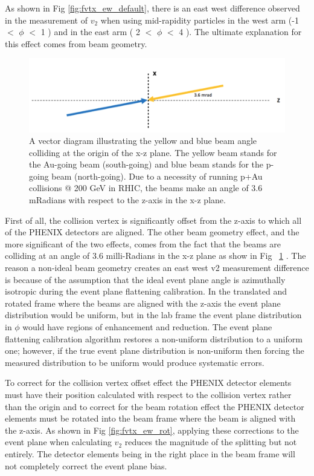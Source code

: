 As shown in Fig \ref{fig:fvtx_ew_default}, there is an east west difference observed in the measurement of $v_2$ when using mid-rapidity particles in the west arm (-1 $<$ $\phi$ $<$ 1 ) and in the east arm ( 2 $<$ $\phi$ $<$ 4 ). The ultimate explanation for this effect comes from beam geometry. 

\begin{figure}[h!]
\begin{center}
\includegraphics[width=0.75\linewidth]{figs/beam_angle.png}
\caption{A vector diagram illustrating the yellow and blue beam angle colliding at the origin of the x-z plane. The yellow beam stands for the Au-going beam (south-going) and blue beam stands for the p-going beam (north-going). Due to a necessity of running p+Au collisions @ 200 GeV  in RHIC, the beams make an angle of 3.6 mRadians with respect to the z-axis in the x-z plane.}
\label{fig:diagram2}
\end{center}
\end{figure}
First of all, the collision vertex is significantly offset from the z-axis to which all of the PHENIX detectors are aligned. The other beam geometry effect, and the more significant of the two effects, comes from the fact that the beams are colliding at an angle of 3.6 milli-Radians in the x-z plane as show in Fig ~\ref{fig:diagram2} \cite{BNL_Run15_Operations}. The reason a non-ideal beam geometry creates an east west v2 measurement difference is because of the assumption that the ideal event plane angle is azimuthally isotropic during the event plane flattening calibration. In the translated and rotated frame where the beams are aligned with the z-axis the event plane distribution would be uniform, but in the lab frame the event plane distribution in $\phi$ would have regions of enhancement and reduction. The event plane flattening calibration algorithm restores a non-uniform distribution to a uniform one; however, if the true event plane distribution is non-uniform then forcing the measured distribution to be uniform would produce systematic errors.

To correct for the collision vertex offset effect the PHENIX detector elements must have their position calculated with respect to the collision vertex rather than the origin and to correct for the beam rotation effect the PHENIX detector elements must be rotated into the beam frame where the beam is aligned with the z-axis. As shown in Fig \ref{fig:fvtx_ew_rot}, applying these corrections to the event plane when calculating $v_2$ reduces the magnitude of the splitting but not entirely. The detector elements being in the right place in the beam frame will not completely correct the event plane bias.

